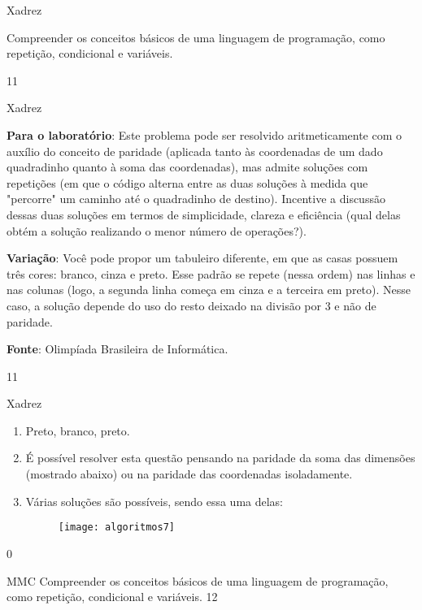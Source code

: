 \begin{objectives}{Xadrez}
{
Compreender os conceitos básicos de uma linguagem de programação, como repetição, condicional e variáveis.


}{1}{1}
\end{objectives}
\begin{sugestions}{Xadrez}
{
\textbf{Para o laboratório}: Este problema pode ser resolvido aritmeticamente com o auxílio do conceito de paridade (aplicada tanto às coordenadas de um dado quadradinho quanto à soma das coordenadas), mas admite soluções com repetições (em que o código alterna entre as duas soluções à medida que "percorre"{} um caminho até o quadradinho de destino). Incentive a discussão dessas duas soluções em termos de simplicidade, clareza e eficiência (qual delas obtém a solução realizando o menor número de operações?).

\textbf{Variação}: Você pode propor um tabuleiro diferente, em que as casas possuem três cores: branco, cinza e preto. Esse padrão se repete (nessa ordem) nas linhas e nas colunas (logo, a segunda linha começa em cinza e a terceira em preto). Nesse caso, a solução depende do uso do resto deixado na divisão por 3 e não de paridade.

\textbf{Fonte}: Olimpíada Brasileira de Informática.

}{1}{1}
\end{sugestions}
\begin{answer}{Xadrez}
{
\begin{enumerate}
\item Preto, branco, preto.
\item É possível resolver esta questão pensando na paridade da soma das dimensões (mostrado abaixo) ou na paridade das coordenadas isoladamente.

\item Várias soluções são possíveis, sendo essa uma delas:

\begin{figure}[H]
\centering

\texttt{[image: algoritmos7]}
\end{figure}
\end{enumerate}
}{0}
\end{answer}
\begin{objectives}{MMC}
{
Compreender os conceitos básicos de uma linguagem de programação, como repetição, condicional e variáveis.
}{1}{2}
\end{objectives}

